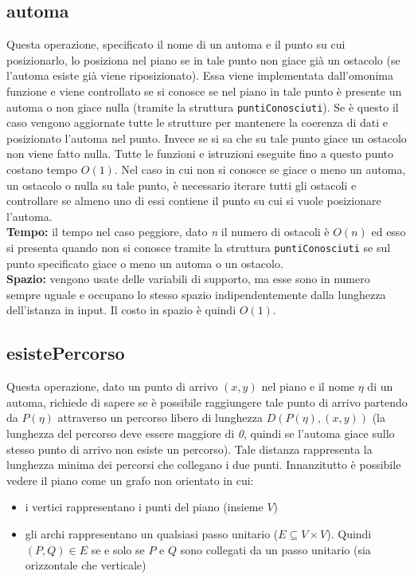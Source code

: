 \documentclass[a4paper,11pt]{article}
\begin{document}
\subsection{automa}

Questa operazione, specificato il nome di un automa e il punto su cui posizionarlo, lo posiziona nel piano se in tale punto non giace già un ostacolo (se l'automa esiste già viene riposizionato). Essa viene implementata dall'omonima funzione e viene controllato se si conosce se nel piano in tale punto è presente un automa o non giace nulla (tramite la struttura \texttt{puntiConosciuti}). Se è questo il caso vengono aggiornate tutte le strutture per mantenere la coerenza di dati e posizionato l'automa nel punto. Invece se si sa che su tale punto giace un ostacolo non viene fatto nulla. Tutte le funzioni e istruzioni eseguite fino a questo punto costano tempo $O(1)$. Nel caso in cui non si conosce se giace o meno un automa, un ostacolo o nulla su tale punto, è necessario iterare tutti gli ostacoli e controllare se almeno uno di essi contiene il punto su cui si vuole posizionare l'automa. \\ 
\textbf{Tempo:} il tempo nel caso peggiore, dato \textit{n} il numero di ostacoli è $O(n)$ ed esso si presenta quando non si conosce tramite la struttura \texttt{puntiConosciuti} se sul punto specificato giace o meno un automa o un ostacolo. \\
\textbf{Spazio:} vengono usate delle variabili di supporto, ma esse sono in numero sempre uguale e occupano lo stesso spazio indipendentemente dalla lunghezza dell'istanza in input. Il costo in spazio è quindi $O(1)$.


\subsection{esistePercorso}

Questa operazione, dato un punto di arrivo $(x, y)$ nel piano e il nome $\eta$ di un automa, richiede di sapere se è possibile raggiungere tale punto di arrivo partendo da $P(\eta)$ attraverso un percorso libero di lunghezza $D(P(\eta), (x, y))$ (la lunghezza del percorso deve essere maggiore di \textit{0}, quindi se l'automa giace sullo stesso punto di arrivo non esiste un percorso). Tale distanza rappresenta la lunghezza minima dei percorsi che collegano i due punti. Innanzitutto è possibile vedere il piano come un grafo non orientato in cui:

\begin{itemize}
    \item i vertici rappresentano i punti del piano (insieme $V$)

    \item gli archi rappresentano un qualsiasi passo unitario ($E \subseteq V \times V$). Quindi $(P, Q) \in E$ se e solo se $P$ e $Q$ sono collegati da un passo unitario (sia orizzontale che verticale)
\end{itemize}
\end{document}
